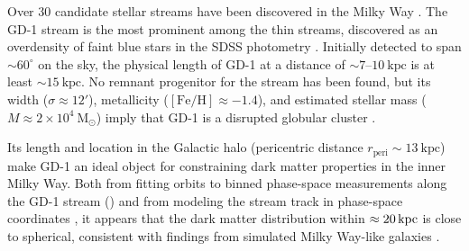 \documentclass[modern]{aastex62}
\newcommand{\msun}{\textrm{M}_\odot}
\newcommand{\kpc}{\textrm{kpc}}
\newcommand{\feh}{\ensuremath{[\textrm{Fe} / \textrm{H}]}}
\begin{document}
Over 30 candidate stellar streams have been discovered in the Milky Way \citep[see][for a recent review]{Grillmair:2016, Newberg:2016}.
The GD-1 stream is the most prominent among the thin streams, discovered as an
overdensity of faint blue stars in the SDSS photometry \citep{Grillmair:2006}.
Initially detected to span $\sim 60^\circ$ on the sky, the physical length of GD-1 at a distance of $\sim
7$--$10~\textrm{kpc}$ is at least $\sim 15~\kpc$.
No remnant progenitor for the stream has been found, but its width ($\sigma
\approx 12'$), metallicity ($\feh \approx -1.4$), and estimated stellar mass ($M
\approx 2 \times 10^4~\msun$) imply that GD-1 is a disrupted globular cluster
\citep{Koposov:2010}.

Its length and location in the Galactic halo (pericentric distance
$r_\textrm{peri} \sim 13~\kpc$) make GD-1 an ideal object for constraining dark
matter properties in the inner Milky Way.
Both from fitting orbits to binned phase-space measurements along the GD-1
stream (\citealt{Koposov:2010}) and from modeling the stream track in
phase-space coordinates \citep{Bowden:2015, Bovy:2016}, it appears that the dark
matter distribution within $\approx20\,\rm kpc$ is close to spherical, consistent 
with findings from simulated Milky Way-like galaxies \citep{Zhu:2016}.
\end{document}
